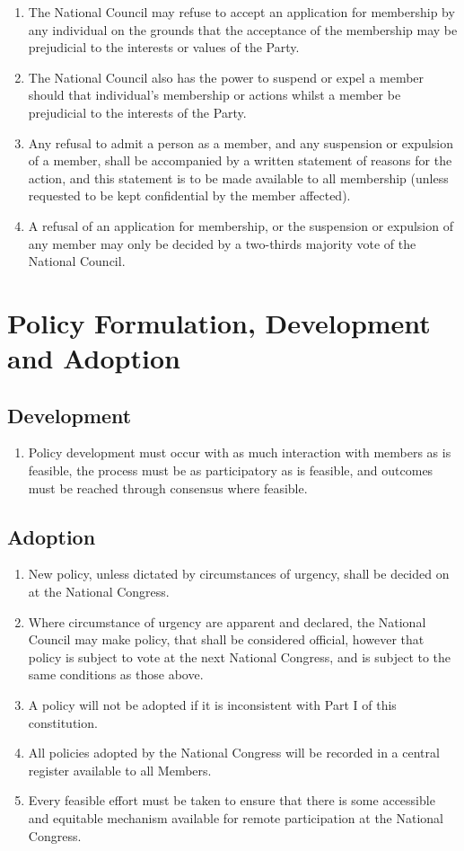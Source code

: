\documentclass[a4paper,titlepage,8.5pt]{article}
\begin{document}
\begin{enumerate}
\item The National Council may refuse to accept an application for membership by any individual on the grounds that the acceptance of the membership may be prejudicial to the interests or values of the Party.
\item The National Council also has the power to suspend or expel a member should that individual’s membership or actions whilst a member be prejudicial to the interests of the Party.
\item Any refusal to admit a person as a member, and any suspension or expulsion of a member, shall be accompanied by a written statement of reasons for the action, and this statement is to be made available to all membership (unless requested to be kept confidential by the member affected).
\item A refusal of an application for membership, or the suspension or expulsion of any member may only be decided by a two-thirds majority vote of the National Council.
\end{enumerate}


\section{Policy Formulation, Development and Adoption}

\subsection{Development}

\begin{enumerate}
\item Policy development must occur with as much interaction with members as is feasible, the process must be as participatory as is feasible, and outcomes must be reached through consensus where feasible.
\end{enumerate}

\subsection{Adoption}

\begin{enumerate}
\item New policy, unless dictated by circumstances of urgency, shall be decided on at the National Congress.
\item Where circumstance of urgency are apparent and declared, the National Council may make policy, that shall be considered official, however that policy is subject to vote at the next National Congress, and is subject to the same conditions as those above.
\item A policy will not be adopted if it is inconsistent with Part I of this constitution.
\item All policies adopted by the National Congress will be recorded in a central register available to all Members.
\item Every feasible effort must be taken to ensure that there is some accessible and equitable mechanism available for remote participation at the National Congress.
\end{enumerate}
\end{document}
